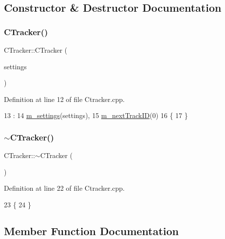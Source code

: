 \subsection{Constructor \& Destructor Documentation}
\mbox{\label{class_c_tracker_a37a89d416c0a9f234b20849667a154c4}} 
\subsubsection{\texorpdfstring{C\+Tracker()}{CTracker()}}
{\footnotesize\ttfamily C\+Tracker\+::\+C\+Tracker (\begin{DoxyParamCaption}\item[{const \mbox{\hyperlink{struct_tracker_settings}{Tracker\+Settings}} \&}]{settings }\end{DoxyParamCaption})}



Definition at line 12 of file Ctracker.\+cpp.


\begin{DoxyCode}
13     :
14       \mbox{\hyperlink{class_c_tracker_acb84aee0d550f4cdadbfac6735811050}{m\_settings}}(settings),
15       \mbox{\hyperlink{class_c_tracker_acaa6995a64483d7666ff2117f1671fed}{m\_nextTrackID}}(0)
16 \{
17 \}
\end{DoxyCode}
\mbox{\label{class_c_tracker_ab74d4f1ce428c9d3fa9f9e9901a2070a}} 
\subsubsection{\texorpdfstring{$\sim$\+C\+Tracker()}{~CTracker()}}
{\footnotesize\ttfamily C\+Tracker\+::$\sim$\+C\+Tracker (\begin{DoxyParamCaption}\item[{void}]{ }\end{DoxyParamCaption})}



Definition at line 22 of file Ctracker.\+cpp.


\begin{DoxyCode}
23 \{
24 \}
\end{DoxyCode}


\subsection{Member Function Documentation}
\mbox{\label{class_c_tracker_a9ddba40ad9a0196e1e75f9b9048be4f2}} 
